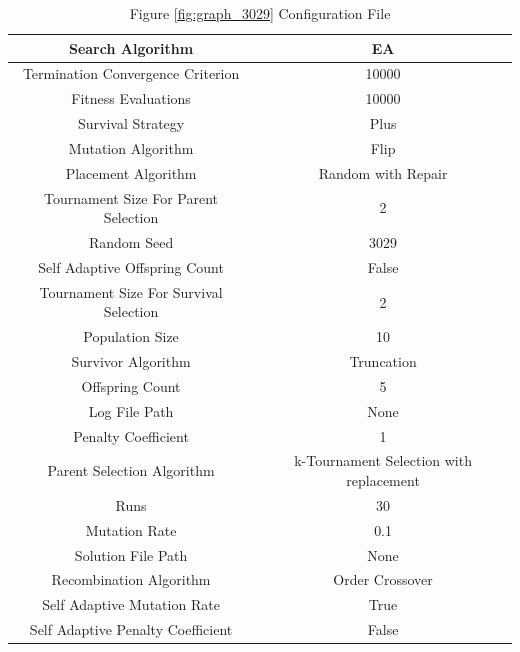 \documentclass{standalone}
\begin{document}
\begin{table}[!htb]
	\centering
	\caption{Figure \ref{fig:graph_3029} Configuration File}
	\label{tab:graph_3029}
	\begin{tabular}{| c | c |}
		\hline
		Search Algorithm		& EA		 \\
		\hline
		Termination Convergence Criterion		& 10000		 \\
		\hline
		Fitness Evaluations		& 10000		 \\
		\hline
		Survival Strategy		& Plus		 \\
		\hline
		Mutation Algorithm		& Flip		 \\
		\hline
		Placement Algorithm		& Random with Repair		 \\
		\hline
		Tournament Size For Parent Selection		& 2		 \\
		\hline
		Random Seed		& 3029		 \\
		\hline
		Self Adaptive Offspring Count		& False		 \\
		\hline
		Tournament Size For Survival Selection		& 2		 \\
		\hline
		Population Size		& 10		 \\
		\hline
		Survivor Algorithm		& Truncation		 \\
		\hline
		Offspring Count		& 5		 \\
		\hline
		Log File Path		& None		 \\
		\hline
		Penalty Coefficient		& 1		 \\
		\hline
		Parent Selection Algorithm		& k-Tournament Selection with replacement		 \\
		\hline
		Runs		& 30		 \\
		\hline
		Mutation Rate		& 0.1		 \\
		\hline
		Solution File Path		& None		 \\
		\hline
		Recombination Algorithm		& Order Crossover		 \\
		\hline
		Self Adaptive Mutation Rate		& True		 \\
		\hline
		Self Adaptive Penalty Coefficient		& False		 \\
		\hline
	\end{tabular}
\end{table}
\end{document}
